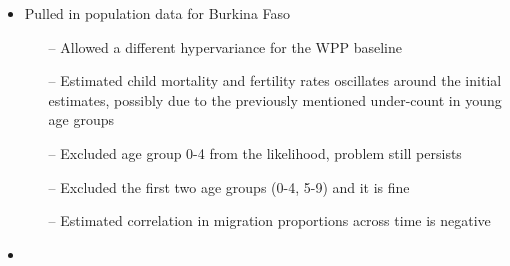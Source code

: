 \documentclass[12pt,a4paper]{article}
\date{\vspace{-5ex}}
\begin{document}
\begin{itemize}
\item Pulled in population data for Burkina Faso 
\begin{itemize}
\item[--] Allowed a different hypervariance for the WPP baseline
\item[--] Estimated child mortality and fertility rates oscillates around the initial estimates, possibly due to the previously mentioned under-count in young age groups
\item[--] Excluded age group 0-4 from the likelihood, problem still persists
\item[--] Excluded the first two age groups (0-4, 5-9) and it is fine
\item[--] Estimated correlation in migration proportions across time is negative 
\end{itemize}
\item 

\end{itemize}


\end{document}
